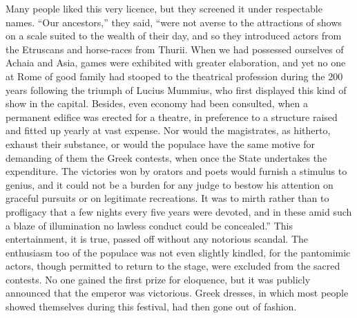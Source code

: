 Many people liked this very licence, but they screened it under respectable names. ``Our ancestors,'' they said, ``were not averse to the attractions of shows on a scale suited to the wealth of their day, and so they introduced actors from the Etruscans and horse-races from Thurii. When we had possessed ourselves of Achaia and Asia, games were exhibited with greater elaboration, and yet no one at Rome of good family had stooped to the theatrical profession during the 200 years following the triumph of Lucius Mummius, who first displayed this kind of show in the capital. Besides, even economy had been consulted, when a permanent edifice was erected for a theatre, in preference to a structure raised and fitted up yearly at vast expense. Nor would the magistrates, as hitherto, exhaust their substance, or would the populace have the same motive for demanding of them the Greek contests, when once the State undertakes the expenditure. The victories won by orators and poets would furnish a stimulus to genius, and it could not be a burden for any judge to bestow his attention on graceful pursuits or on legitimate recreations. It was to mirth rather than to profligacy that a few nights every five years were devoted, and in these amid such a blaze of illumination no lawless conduct could be concealed.'' This entertainment, it is true, passed off without any notorious scandal. The enthusiasm too of the populace was not even slightly kindled, for the pantomimic actors, though permitted to return to the stage, were excluded from the sacred contests. No one gained the first prize for eloquence, but it was publicly announced that the emperor was victorious. Greek dresses, in which most people showed themselves during this festival, had then gone out of fashion.



